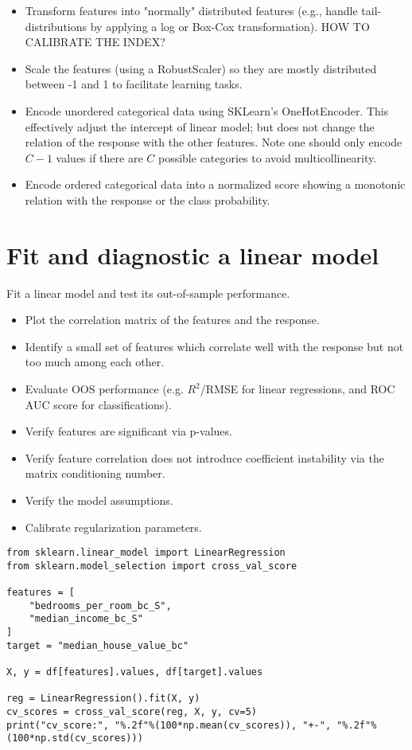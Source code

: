 \documentclass[]{article}
\begin{document}
\begin{itemize}
	\item Transform features into "normally" distributed features (e.g., handle tail-distributions by applying a log or Box-Cox transformation). HOW TO CALIBRATE THE INDEX?
	\item Scale the features (using a RobustScaler) so they are mostly distributed between -1 and 1 to facilitate learning tasks.
	\item Encode unordered categorical data using SKLearn's OneHotEncoder. This effectively adjust the intercept of linear model; but does not change the relation of the response with the other features. Note one should only encode $C-1$ values if there are $C$ possible categories to avoid multicollinearity.
	\item Encode ordered categorical data into a normalized score showing a monotonic relation with the response or the class probability.
\end{itemize}

\section{Fit and diagnostic a linear model}

Fit a linear model and test its out-of-sample performance.
\begin{itemize}
\item Plot the correlation matrix of the features and the response.
\item Identify a small set of features which correlate well with the response but not too much among each other.
\item Evaluate OOS performance (e.g. $R^2$/RMSE for linear regressions, and ROC AUC score for classifications).
\item Verify features are significant via p-values.
\item Verify feature correlation does not introduce coefficient instability via the matrix conditioning number.
\item Verify the model assumptions.
\item Calibrate regularization parameters.
\end{itemize}

\begin{lstlisting}
from sklearn.linear_model import LinearRegression
from sklearn.model_selection import cross_val_score

features = [
    "bedrooms_per_room_bc_S", 
    "median_income_bc_S"
]
target = "median_house_value_bc"

X, y = df[features].values, df[target].values

reg = LinearRegression().fit(X, y)
cv_scores = cross_val_score(reg, X, y, cv=5)
print("cv_score:", "%.2f"%(100*np.mean(cv_scores)), "+-", "%.2f"%(100*np.std(cv_scores)))
\end{lstlisting}
\end{document}
